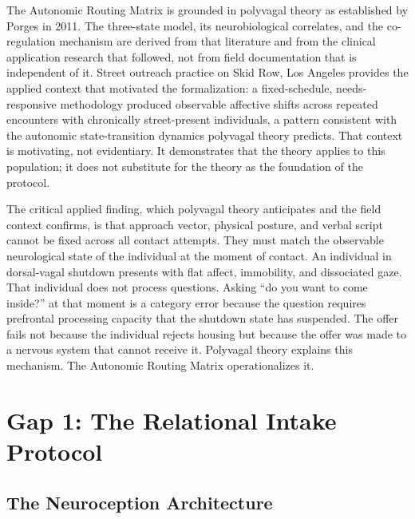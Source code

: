 \documentclass[12pt, letterpaper]{article}
\begin{document}
The Autonomic Routing Matrix is grounded in polyvagal theory as established by Porges in 2011. The three-state model, its neurobiological correlates, and the co-regulation mechanism are derived from that literature and from the clinical application research that followed, not from field documentation that is independent of it. Street outreach practice on Skid Row, Los Angeles provides the applied context that motivated the formalization: a fixed-schedule, needs-responsive methodology produced observable affective shifts across repeated encounters with chronically street-present individuals, a pattern consistent with the autonomic state-transition dynamics polyvagal theory predicts. That context is motivating, not evidentiary. It demonstrates that the theory applies to this population; it does not substitute for the theory as the foundation of the protocol.

The critical applied finding, which polyvagal theory anticipates and the field context confirms, is that approach vector, physical posture, and verbal script cannot be fixed across all contact attempts. They must match the observable neurological state of the individual at the moment of contact. An individual in dorsal-vagal shutdown presents with flat affect, immobility, and dissociated gaze. That individual does not process questions. Asking ``do you want to come inside?'' at that moment is a category error because the question requires prefrontal processing capacity that the shutdown state has suspended. The offer fails not because the individual rejects housing but because the offer was made to a nervous system that cannot receive it. Polyvagal theory explains this mechanism. The Autonomic Routing Matrix operationalizes it.


\clearpage
\section{Gap 1: The Relational Intake Protocol}

\subsection{The Neuroception Architecture}
\end{document}
